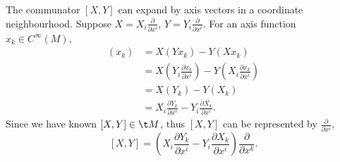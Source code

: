 \begin{enumerate}
\prob The communator $[X,Y]$ can expand by axis vectors in a coordinate neighbourhood.
\soln Suppose $X= X_i \frac{\partial}{\partial x^i}$, $Y= Y_i \frac{\partial}{\partial x^i}$. For an axis function $x_k \in C^\infty (M)$,
\begin{align*}
	[X,Y] (x_k) &= X(Y x_k)- Y(X x_k)
	\\ &= X(Y_i \frac{\partial x_k}{\partial x^i})- Y(X_i \frac{\partial x_k}{\partial x^i})
	\\ &= X(Y_k)- Y(X_k)
	\\ &= X_i \frac{\partial Y_k}{\partial x^i}- Y_i \frac{\partial X_k}{\partial x^i}.
\end{align*}
Since we have known $[X,Y]\in \t M$, thus $[X,Y]$ can be represented by $\frac{\partial}{\partial x^i}$,
$$[X,Y]=(X_i \frac{\partial Y_k}{\partial x^i}- Y_i \frac{\partial X_k}{\partial x^i}) \frac{\partial}{\partial x^k}.$$

\end{enumerate}
